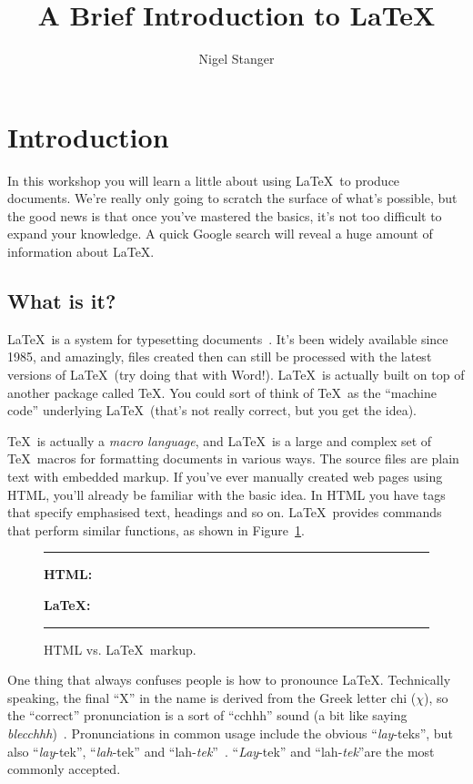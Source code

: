 \documentclass[12pt,a4paper]{article}
\title{A Brief Introduction to \LaTeX}
\author{Nigel Stanger}
\begin{document}
\maketitle


\section{Introduction}
\label{sec:intro}

In this workshop you will learn a little about using \LaTeX\ to produce
documents. We're really only going to scratch the surface of what's
possible, but the good news is that once you've mastered the basics,
it's not too difficult to expand your knowledge. A quick Google search
will reveal a huge amount of information about \LaTeX.


\subsection{What is it?}
\label{sec:what}

\LaTeX\ is a system for typesetting documents~\cite{UsersGuide}. It's
been widely available since 1985, and amazingly, files created then can
still be processed with the latest versions of \LaTeX\ (try doing that
with Word!). \LaTeX\ is actually built on top of another package called
\TeX. You could sort of think of \TeX\ as the ``machine code''
underlying \LaTeX\ (that's not really correct, but you get the idea).

\TeX\ is actually a \emph{macro language}, and \LaTeX\ is a large and
complex set of \TeX\ macros for formatting documents in various ways.
The source files are plain text with embedded markup. If you've ever
manually created web pages using HTML, you'll already be familiar with
the basic idea. In HTML you have tags that specify emphasised text,
headings and so on. \LaTeX\ provides commands that perform similar
functions, as shown in Figure~\ref{fig:HTMLcomparison}.

\begin{figure}
	\hrule\medskip
	\textbf{HTML:}

	\bigskip
	
	\textbf{\LaTeX:}

	\hrule
	\caption{HTML vs. \LaTeX\ markup.}
	\label{fig:HTMLcomparison}
\end{figure}

One thing that always confuses people is how to pronounce \LaTeX.
Technically speaking, the final ``X'' in the name is derived from the
Greek letter chi ($\chi$), so the ``correct'' pronunciation is a sort of
``cchhh'' sound (a bit like saying \emph{blecchhh})~\cite{TeXBook}.
Pronunciations in common usage include the obvious ``\emph{lay}-teks'',
but also ``\emph{lay}-tek'', ``\emph{lah}-tek'' and
``lah-\emph{tek}''~\cite{UsersGuide}. ``\emph{Lay}-tek''  and
``lah-\emph{tek}''are the most commonly accepted.
\end{document}
